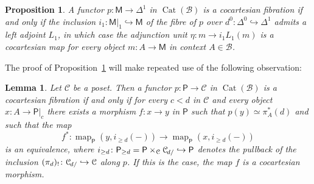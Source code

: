 \documentclass[reqno]{amsart}
\numberwithin{equation}{subsection}
\theoremstyle{plain}
\newtheorem{proposition}[equation]{Proposition}
\newtheorem{lemma}[equation]{Lemma}
\theoremstyle{definition}
\let\scr=\mathcal
\let\into=\hookrightarrow
\def\BB{\scr B}
\def\CC{\scr C}
\DeclareMathOperator{\Cat}{Cat}
\DeclareMathOperator{\Map}{map}
\newcommand{\map}[1]{\Map_{#1}}
\newcommand{\Under}[2]{#1_{\hspace{-1pt}#2/}}
\newcommand{\I}[1]{\mathsf{#1}}
\begin{document}
\begin{proposition}
	\label{prop:cocartesianFibrationIntervalReflective}
	A functor $p\colon\I{M}\to\Delta^1$ in $\Cat(\BB)$ is a cocartesian fibration if and only if the inclusion $i_1\colon\I{M}\vert_{1}\into\I{M}$ of the fibre of $p$ over $d^0\colon\Delta^0\into\Delta^1$ admits a left adjoint $L_1$, in which case the adjunction unit $\eta\colon m\to i_1L_1 (m)$ is a cocartesian map for every object $m\colon A\to \I{M}$ in context $A\in\BB$.
\end{proposition}
The proof of Proposition~\ref{prop:cocartesianFibrationIntervalReflective} will make repeated use of the following observation:
\begin{lemma}
	\label{lem:cocartesianFibrationPoset}
	Let $\CC$ be a poset. Then a functor $p\colon\I{P}\to\CC$ in $\Cat(\BB)$ is a cocartesian fibration if and only if for every $c<d$ in $\CC$ and every object $x\colon A\to \I{P}\vert_c$ there exists a morphism $f\colon x\to y $ in $\I{P}$ such that $p(y)\simeq \pi_A^\ast(d)$ and such that the map
	\begin{equation*}
	f^\ast\colon \map{\I{P}}(y,i_{\geq d}(-))\to\map{\I{P}}(x,i_{\geq d}(-))
	\end{equation*}
	is an equivalence, where $i_{\geq d}\colon \I{P}_{\geq d}=\I{P}\times_{\CC}\Under{\CC}{d}\into\I{P}$ denotes the pullback of the inclusion $(\pi_d)_!\colon\Under{\CC}{d}\into\CC$ along $p$. If this is the case, the map $f$ is a cocartesian morphism.
\end{lemma}
\end{document}
